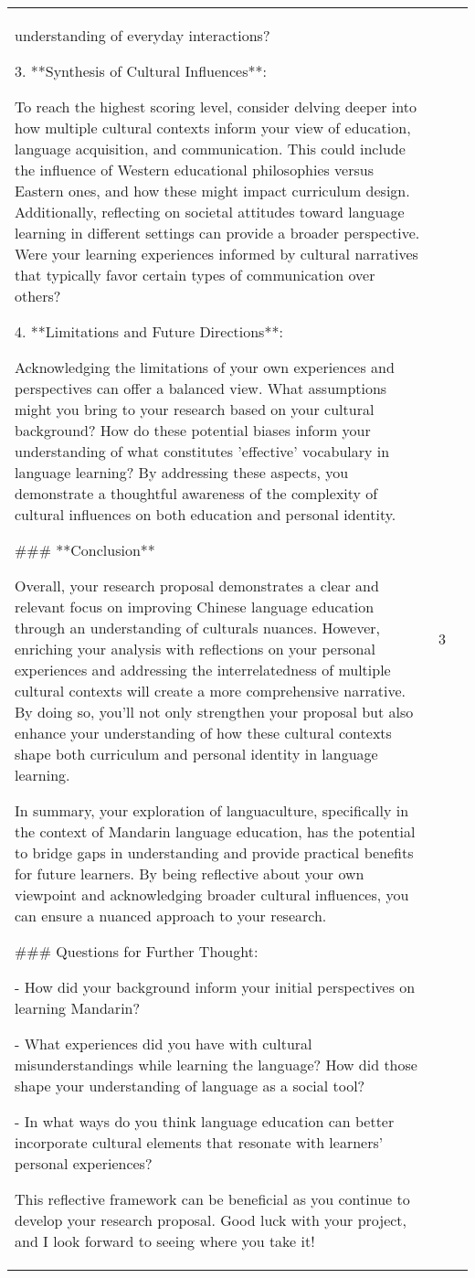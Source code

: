 \begin{center}
\begin{longtable}{|p{}|p{}|p{}|}
understanding of everyday interactions?\par 3. **Synthesis of Cultural Influences**:\par    To reach the highest scoring level, consider delving deeper into how multiple cultural contexts inform your view of education, language acquisition, and communication. This could include the influence of Western educational philosophies versus Eastern ones, and how these might impact curriculum design. Additionally, reflecting on societal attitudes toward language learning in different settings can provide a broader perspective. Were your learning experiences informed by cultural narratives that typically favor certain types of communication over others?\par 4. **Limitations and Future Directions**:\par    Acknowledging the limitations of your own experiences and perspectives can offer a balanced view. What assumptions might you bring to your research based on your cultural background? How do these potential biases inform your understanding of what constitutes 'effective' vocabulary in language learning? By addressing these aspects, you demonstrate a thoughtful awareness of the complexity of cultural influences on both education and personal identity.\par \#\#\# **Conclusion**\par Overall, your research proposal demonstrates a clear and relevant focus on improving Chinese language education through an understanding of culturals nuances. However, enriching your analysis with reflections on your personal experiences and addressing the interrelatedness of multiple cultural contexts will create a more comprehensive narrative. By doing so, you'll not only strengthen your proposal but also enhance your understanding of how these cultural contexts shape both curriculum and personal identity in language learning.\par In summary, your exploration of languaculture, specifically in the context of Mandarin language education, has the potential to bridge gaps in understanding and provide practical benefits for future learners. By being reflective about your own viewpoint and acknowledging broader cultural influences, you can ensure a nuanced approach to your research.\par \#\#\# Questions for Further Thought:\par - How did your background inform your initial perspectives on learning Mandarin?\par - What experiences did you have with cultural misunderstandings while learning the language? How did those shape your understanding of language as a social tool?\par - In what ways do you think language education can better incorporate cultural elements that resonate with learners' personal experiences?\par This reflective framework can be beneficial as you continue to develop your research proposal. Good luck with your project, and I look forward to seeing where you take it! & 3 \\

\end{longtable}
\end{center}
